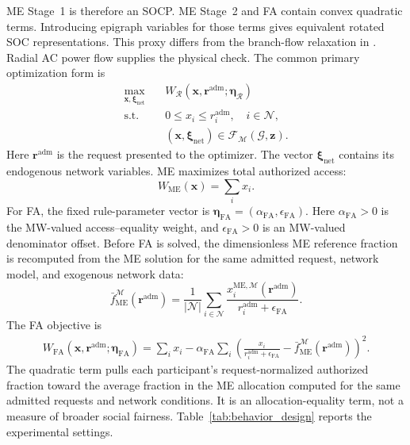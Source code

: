 \documentclass[twoside,twocolumn,9pt]{article}
\begin{document}
{ME Stage~1 is therefore an SOCP. ME Stage~2 and FA contain
convex quadratic terms. Introducing epigraph variables for those terms gives
equivalent rotated SOC representations. This proxy differs from the branch-flow
relaxation in \cite{farivar2013branch1}. Radial AC power flow supplies the
physical check. The common primary optimization form is
\begin{equation}
\begin{aligned}
\max_{\mathbf x,\boldsymbol\xi_{\mathrm{net}}}\quad
&W_{\mathcal R}(\mathbf x,\mathbf r^{\mathrm{adm}};\boldsymbol\eta_{\mathcal R})\\
\mathrm{s.t.}\quad
&0\le x_i\le r_i^{\mathrm{adm}},\quad i\in\mathcal N,\\
&(\mathbf x,\boldsymbol\xi_{\mathrm{net}})\in
\mathcal F_{\mathcal M}(\mathcal G,\mathbf z).
\end{aligned}
\label{eq:opf_stub}
\end{equation}
Here $\mathbf r^{\mathrm{adm}}$ is the request presented to the optimizer.
The vector $\boldsymbol\xi_{\mathrm{net}}$ contains its endogenous network
variables. ME maximizes total authorized access:
\begin{equation}
W_{\mathrm{ME}}(\mathbf x)=\sum_i x_i.
\label{eq:max_export_objective}
\end{equation}
For FA, the fixed rule-parameter vector is
$\boldsymbol\eta_{\mathrm{FA}}=(\alpha_{\mathrm{FA}},\epsilon_{\mathrm{FA}})$.
Here $\alpha_{\mathrm{FA}}>0$ is the MW-valued access--equality weight, and
$\epsilon_{\mathrm{FA}}>0$ is an MW-valued denominator offset. Before FA is
solved, the dimensionless ME reference fraction is recomputed from the ME
solution for the same admitted request, network model, and exogenous network
data:
\begin{equation}
\bar f_{\mathrm{ME}}^{\mathcal M}(\mathbf r^{\mathrm{adm}})
=\frac{1}{|\mathcal N|}\sum_{i\in\mathcal N}
\frac{x_i^{\mathrm{ME},\mathcal M}(\mathbf r^{\mathrm{adm}})}{r_i^{\mathrm{adm}}+\epsilon_{\mathrm{FA}}}.
\label{eq:fairness_reference_fraction}
\end{equation}
The FA objective is
\begin{equation}
\begin{aligned}
W_{\mathrm{FA}}(\mathbf x,\mathbf r^{\mathrm{adm}};
\boldsymbol\eta_{\mathrm{FA}})
=\sum_i x_i-\alpha_{\mathrm{FA}}\sum_i\left(
\frac{x_i}{r_i^{\mathrm{adm}}+\epsilon_{\mathrm{FA}}}
-\bar f_{\mathrm{ME}}^{\mathcal M}(\mathbf r^{\mathrm{adm}})
\right)^2.
\end{aligned}
\label{eq:fairness_objective}
\end{equation}
The quadratic term pulls each participant's request-normalized authorized
fraction toward the average fraction in the ME allocation computed for the
same admitted requests and network conditions. It is
an allocation-equality term, not a measure of broader social fairness.
Table~\ref{tab:behavior_design} reports the experimental settings.

}
\end{document}
